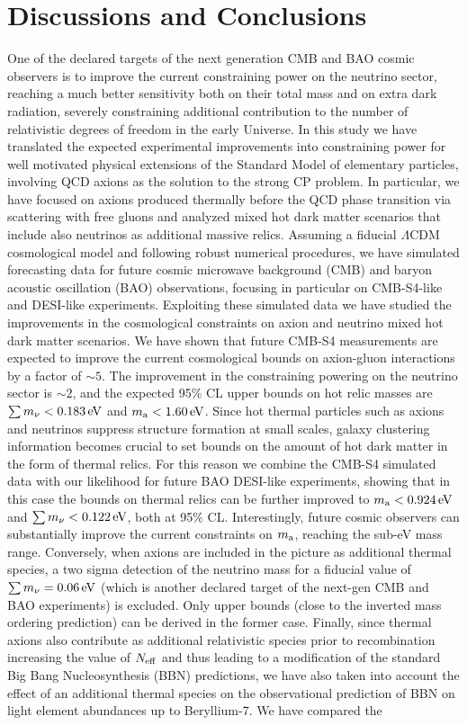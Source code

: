 \documentclass[fleqn,usenatbib,letters]{mnras}
\begin{document}
\section{Discussions and Conclusions} \label{Sec.Conclusions}
One of the declared targets of the next generation CMB and BAO cosmic observers is to improve the current constraining power on the neutrino sector, reaching a much better sensitivity both on their total mass and on extra dark radiation, severely constraining additional contribution to the number of relativistic degrees of freedom in the early Universe. In this study we have translated the expected experimental improvements into constraining power for well motivated physical extensions of the Standard Model of elementary particles, involving QCD axions as the solution to the strong CP problem. In particular, we have focused on axions produced thermally before the QCD phase transition via scattering with free gluons and analyzed mixed hot dark matter scenarios that include also neutrinos as additional massive relics. Assuming a fiducial $\Lambda$CDM cosmological model and following robust numerical procedures, we have simulated forecasting data for future cosmic microwave background (CMB) and baryon acoustic oscillation (BAO) observations, focusing in particular on CMB-S4-like and DESI-like experiments. Exploiting these simulated data we have studied the improvements in the cosmological constraints on axion and neutrino mixed hot dark matter scenarios. We have shown that future CMB-S4 measurements are expected to improve the current cosmological bounds on axion-gluon interactions by a factor of $\sim 5$. The improvement in the constraining powering on the neutrino sector is $\sim 2$, and the expected 95\% CL upper bounds on hot relic masses are $\sum m_{\nu}<0.183\,\rm{eV}$ and $m_{\rm a}<1.60\,\rm{eV}$. Since hot thermal particles such as axions and neutrinos suppress structure formation at small scales, galaxy clustering information becomes crucial to set bounds on the amount of hot dark matter in the form of thermal relics. For this reason we combine the CMB-S4 simulated data with our likelihood for future BAO DESI-like experiments, showing that in this case the bounds on thermal relics can be further improved to $m_{\rm a}<0.924\,\rm{eV}$ and $\sum m_{\nu}<0.122\,\rm{eV}$, both at 95\% CL. Interestingly, future cosmic observers can substantially improve the current constraints on $m_{\rm a}$, reaching the sub-eV mass range. Conversely, when axions are included in the picture as additional thermal species, a  two sigma detection of the neutrino mass for a fiducial value of $\sum m_{\nu}=0.06\,\rm{eV}$ (which is another declared target of the next-gen CMB and BAO experiments) is excluded. Only upper bounds (close to the inverted mass ordering prediction) can be derived in the former case. Finally, since thermal axions also contribute as additional relativistic species prior to recombination increasing the value of $N_{\rm eff}$ and thus leading to a modification of the standard Big Bang Nucleosynthesis (BBN) predictions, we have also taken into account the effect of an additional thermal species on the observational prediction of BBN on light element abundances up to Beryllium-7. We have compared the 
\end{document}
